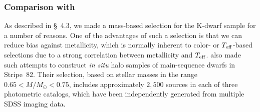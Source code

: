 \documentclass[twocolumn,trackchanges]{aastex63}
\begin{document}



\subsubsection{Comparison with \citet{An:2013,An:2015}}

As described in \S~4.3, we made a mass-based selection for the K-dwarf
sample for a number of reasons. One of the advantages of such a selection
is that we can reduce bias against metallicity, which is normally
inherent to color- or $T_{\rm eff}$-based selections due to a strong
correlation between metallicity and $T_{\rm eff}$. \citet{An:2013,An:2015}
also made such attempts to construct \textit{in situ} halo samples of
main-sequence dwarfs in Stripe~82. Their selection, based on stellar
masses in the range $0.65 < M/M_\odot < 0.75$, includes approximately
$2,500$ sources in each of three photometric catalogs, which have been
independently generated from multiple SDSS imaging data.
\end{document}
